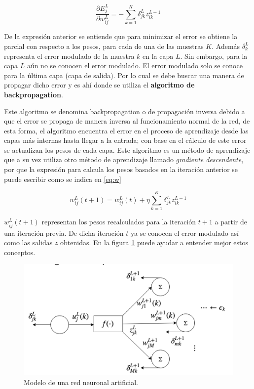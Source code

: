 \documentclass[a4paper,12pt,twocolumn]{article}
\begin{document}
  \begin{equation}
    \dfrac{\partial E_{j}^{L}}{\partial w_{ij}^{L}} =
    -\sum_{k=1}^{K} \delta_{jk}^{L} z_{ik}^{L-1} \label{eq:error-01}
  \end{equation}

  De la expresión anterior se entiende que para minimizar el error se obtiene la
  parcial con respecto a los pesos, para cada de una de las muestras $K$. Además
  $\delta_{k}^{L}$ representa el error modulado de la muestra $k$ en la capa
  $L$.  Sin embargo, para la capa $L$ aún no se conocen el error modulado. El
  error modulado solo se conoce para la última capa (capa de salida). Por lo
  cual se debe buscar una manera de propagar dicho error y es ahí donde se
  utiliza el \textbf{algoritmo de backpropagation}.

  Este algoritmo se denomina backpropagation o de propagación inversa debido a
  que el error se propaga de manera inversa al funcionamiento normal de la red,
  de esta forma, el algoritmo encuentra el error en el proceso de aprendizaje
  desde las capas más internas hasta llegar a la entrada; con base en el cálculo
  de este error se actualizan los pesos de cada capa.
  Este algoritmo es un método de aprendizaje que a su vez utiliza otro método de
  aprendizaje llamado \textit{gradiente descendente}, por que la expresión para
  calcula los pesos basados en la iteración anterior se puede escribir como se
  indica en \ref{eq:w}

  \begin{equation}
    w_{ij}^{L}(t+1) = w_{ij}^{L}(t) + \eta
    \sum_{k=1}^{K}\delta_{jk}^{L}z_{ik}^{L-1}\label{eq:w}
  \end{equation}

  $w_{ij}^{L}(t+1)$ representan los pesos recalculados para la iteración $t + 1$
  a partir de una iteración previa. De dicha iteración $t$ ya se conocen el
  error modulado así como las salidas $z$ obtenidas. En la figura
  \ref{fig:modelo-neurona} puede ayudar a entender mejor estos conceptos.

  \begin{figure}[ht!]
    \centering
    \includegraphics[width=0.7\linewidth]{backpropagation}
    \caption{Modelo de una red neuronal artificial.}
    \label{fig:modelo-neurona}
  \end{figure}
\end{document}
